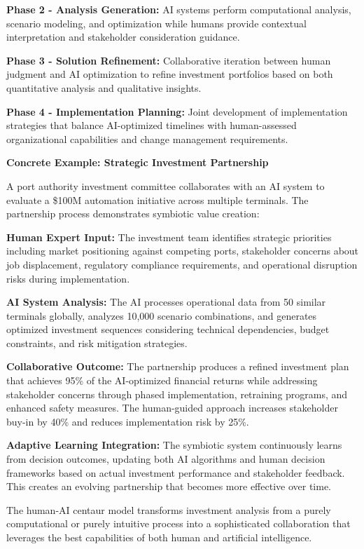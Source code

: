 \documentclass{article}
\begin{document}
\textbf{Phase 2 - Analysis Generation:} AI systems perform computational analysis, scenario modeling, and optimization while humans provide contextual interpretation and stakeholder consideration guidance.

\textbf{Phase 3 - Solution Refinement:} Collaborative iteration between human judgment and AI optimization to refine investment portfolios based on both quantitative analysis and qualitative insights.

\textbf{Phase 4 - Implementation Planning:} Joint development of implementation strategies that balance AI-optimized timelines with human-assessed organizational capabilities and change management requirements.

\textbf{Concrete Example: Strategic Investment Partnership}

A port authority investment committee collaborates with an AI system to evaluate a \$100M automation initiative across multiple terminals. The partnership process demonstrates symbiotic value creation:

\textbf{Human Expert Input:}
The investment team identifies strategic priorities including market positioning against competing ports, stakeholder concerns about job displacement, regulatory compliance requirements, and operational disruption risks during implementation.

\textbf{AI System Analysis:}
The AI processes operational data from 50 similar terminals globally, analyzes 10,000 scenario combinations, and generates optimized investment sequences considering technical dependencies, budget constraints, and risk mitigation strategies.

\textbf{Collaborative Outcome:}
The partnership produces a refined investment plan that achieves 95\% of the AI-optimized financial returns while addressing stakeholder concerns through phased implementation, retraining programs, and enhanced safety measures. The human-guided approach increases stakeholder buy-in by 40\% and reduces implementation risk by 25\%.

\textbf{Adaptive Learning Integration:}
The symbiotic system continuously learns from decision outcomes, updating both AI algorithms and human decision frameworks based on actual investment performance and stakeholder feedback. This creates an evolving partnership that becomes more effective over time.

The human-AI centaur model transforms investment analysis from a purely computational or purely intuitive process into a sophisticated collaboration that leverages the best capabilities of both human and artificial intelligence.
\end{document}
